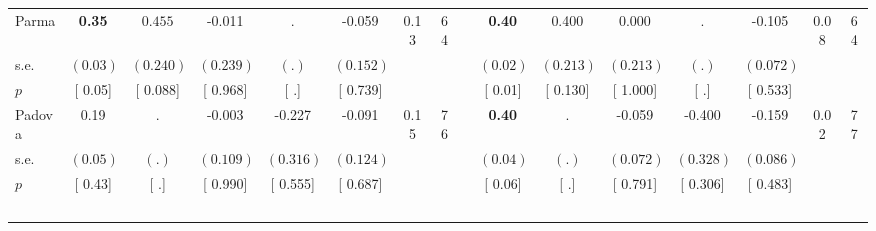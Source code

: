 \begin{longtable}{L{8em} c c c c c c c p{1em} c c c c c c c}
\quad \quad \quad Parma& \textbf{     0.35} & $ \mathbf{    0.455}$ &    -0.011 &         . &    -0.059 &      0.13 &        64 & & \textbf{     0.40} &     0.400 &     0.000 &         . &    -0.105 &      0.08 &        64  \\*
\quad \quad \quad \quad s.e.& $ (     0.03)$ & $ (    0.240)$ & $ (    0.239)$ & $ (        .)$ & $ (    0.152)$ & & & & $ (     0.02)$ & $ (    0.213)$ & $ (    0.213)$ & $ (        .)$ & $ (    0.072)$ & &  \\*
\quad \quad \quad \quad $ p$ & [     0.05] & [    0.088] & [    0.968] & [        .] & [    0.739] & & & & [     0.01] & [    0.130] & [    1.000] & [        .] & [    0.533] & &  \\[1em]
\quad \quad \quad Padova& 0.19 &         . &    -0.003 &    -0.227 &    -0.091 &      0.15 &        76 & & \textbf{     0.40} &         . &    -0.059 &    -0.400 &    -0.159 &      0.02 &        77  \\*
\quad \quad \quad \quad s.e.& $ (     0.05)$ & $ (        .)$ & $ (    0.109)$ & $ (    0.316)$ & $ (    0.124)$ & & & & $ (     0.04)$ & $ (        .)$ & $ (    0.072)$ & $ (    0.328)$ & $ (    0.086)$ & &  \\*
\quad \quad \quad \quad $ p$ & [     0.43] & [        .] & [    0.990] & [    0.555] & [    0.687] & & & & [     0.06] & [        .] & [    0.791] & [    0.306] & [    0.483] & &  \\[1em]
~\\[1em]
\end{longtable}